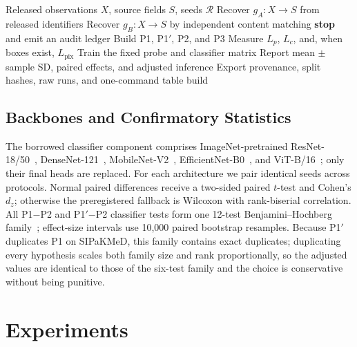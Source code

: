 \documentclass[conference]{IEEEtran}
\newcommand{\protocol}[1]{\textsf{#1}}
\begin{document}
\begin{algorithm}[t]
\caption{Fail-closed provenance-aware evaluation}
\label{alg:cytofair}
\begin{algorithmic}[1]
\Require Released observations $X$, source fields $S$, seeds $\mathcal{R}$
\State Recover $g_A:X\!\to\!S$ from released identifiers
\State Recover $g_B:X\!\to\!S$ by independent content matching
    \State \textbf{stop} and emit an audit ledger
\EndIf
{}
    \State Build \protocol{P1}, \protocol{P1$'$}, \protocol{P2}, and \protocol{P3}
    \State Measure $L_p$, $L_c$, and, when boxes exist, $L_{\mathrm{pix}}$
    \State Train the fixed probe and classifier matrix
\EndFor
\State Report mean $\pm$ sample SD, paired effects, and adjusted inference
\State Export provenance, split hashes, raw runs, and one-command table build
\end{algorithmic}
\end{algorithm}

\subsection{Backbones and Confirmatory Statistics}
The borrowed classifier component comprises ImageNet-pretrained ResNet-18/50~\cite{he2016resnet}, DenseNet-121~\cite{huang2017densenet}, MobileNet-V2~\cite{sandler2018mobilenetv2}, EfficientNet-B0~\cite{tan2019efficientnet}, and ViT-B/16~\cite{dosovitskiy2021vit}; only their final heads are replaced.
For each architecture we pair identical seeds across protocols.
Normal paired differences receive a two-sided paired $t$-test and Cohen's $d_z$; otherwise the preregistered fallback is Wilcoxon with rank-biserial correlation.
All \protocol{P1}$-$\protocol{P2} and \protocol{P1$'$}$-$\protocol{P2} classifier tests form one 12-test Benjamini--Hochberg family~\cite{benjamini1995fdr}; effect-size intervals use 10,000 paired bootstrap resamples.
Because \protocol{P1$'$} duplicates \protocol{P1} on SIPaKMeD, this family contains exact duplicates; duplicating every hypothesis scales both family size and rank proportionally, so the adjusted values are identical to those of the six-test family and the choice is conservative without being punitive.

\section{Experiments}
\end{document}
